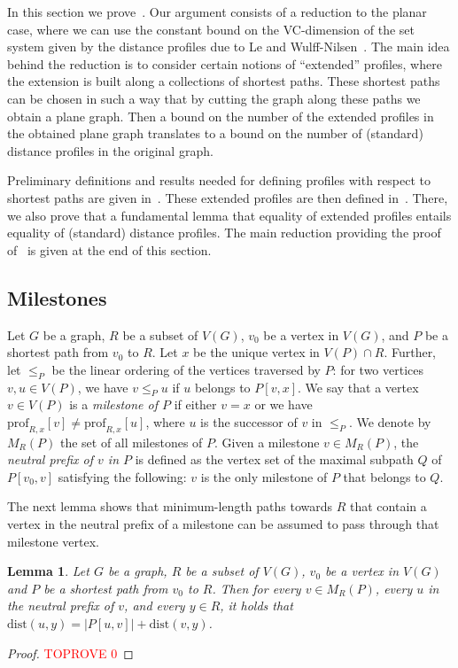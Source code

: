 \documentclass[11pt,a4paper]{article}
\newtheorem{lemma}{Lemma}[section]
\newcommand{\distprofile}[3]{\mathrm{prof}_{#1,#2}[#3]}
\newcommand{\dist}{\mathrm{dist}}
\renewcommand{\le}{\leqslant}
\begin{document}
In this section we prove~. Our argument consists of a reduction to the planar case, where we can use the constant bound on the VC-dimension of the set system given by the distance profiles due to Le and Wulff-Nilsen~\cite{LeW24}.
The main idea behind the reduction is to consider certain notions of ``extended'' profiles, where the extension is built along a collections of shortest paths. These shortest paths can be chosen in such a way that by cutting the graph along these paths we obtain a plane graph. Then a bound on the number of the extended profiles in the obtained plane graph translates to a bound on the number of (standard) distance profiles in the original graph.

Preliminary definitions and results needed for defining profiles with respect to shortest paths are given in~.
These extended profiles are then defined in~. There, we also prove that a fundamental lemma that equality of extended profiles entails equality of (standard) distance profiles.
The main reduction providing the proof of~ is given at the end of this section.

\subsection{Milestones}
\label{subsec:milestones}

Let $G$ be a graph, $R$ be a subset of $V(G)$,
$v_0$ be a vertex in $V(G)$, and $P$ be a shortest path from $v_0$ to $R$. Let $x$ be the unique vertex in $V(P)\cap R$. Further, let $\le_P$ be the linear ordering of the vertices traversed by $P$: for two vertices $v,u\in V(P)$, we have $v\le_P u$ if $u$ belongs to $P[v,x]$.
We say that a vertex $v\in V(P)$ is a \emph{milestone of $P$}
if either $v=x$ or we have $\distprofile{R}{x}{v}\neq\distprofile{R}{x}{u}$, where $u$ is the successor of $v$ in $\le_P$.
We denote by $M_{R}(P)$ the set of all milestones of $P$.
Given a milestone $v\in M_{R}(P)$,
the \emph{neutral prefix of $v$ in $P$} is defined as the vertex set of the maximal subpath $Q$ of $P[v_0,v]$ satisfying the following: $v$ is the only milestone of $P$ that belongs to $Q$.

The next lemma shows that minimum-length paths towards $R$ that contain a vertex in the neutral prefix of a milestone can be assumed to pass through that milestone vertex.

\begin{lemma}
  \label{lem:dispref}
  Let $G$ be a graph, $R$ be a subset of $V(G)$, $v_0$ be a vertex in $V(G)$ and $P$ be a shortest path from $v_0$ to $R$.
  Then for every $v\in M_R(P)$, every $u$ in the neutral prefix of $v$, and every $y\in R$, it holds that
  $\dist(u,y)=|P[u,v]|+\dist(v,y)$. 
\end{lemma}
\begin{proof}\textcolor{red}{TOPROVE 0}\end{proof}
\end{document}
